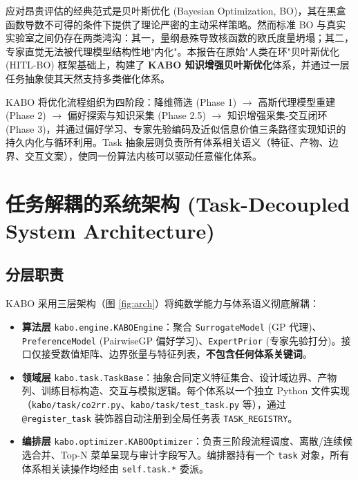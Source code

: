 \documentclass[12pt,a4paper]{article}
\begin{document}
应对昂贵评估的经典范式是贝叶斯优化 (Bayesian Optimization, BO)\cite{bo2012}，其在黑盒函数导数不可得的条件下提供了理论严密的主动采样策略\cite{botorch2019, turbo2019}。然而标准 BO 与真实实验室之间仍存在两类鸿沟：其一，量纲悬殊导致核函数的欧氏度量坍塌\cite{turbo2019}；其二，专家直觉无法被代理模型结构性地"内化"。本报告在原始"人类在环"贝叶斯优化 (HITL-BO) 框架基础上，构建了 \textbf{KABO 知识增强贝叶斯优化}体系，并通过一层任务抽象使其天然支持多类催化体系。

KABO 将优化流程组织为四阶段：降维筛选 (Phase 1) $\rightarrow$ 高斯代理模型重建 (Phase 2) $\rightarrow$ 偏好探索与知识采集 (Phase 2.5) $\rightarrow$ 知识增强采集-交互闭环 (Phase 3)，并通过偏好学习\cite{astudillo2019}、专家先验编码\cite{li2020prior}及近似信息价值\cite{wu2016kg}三条路径实现知识的持久内化与循环利用。Task 抽象层则负责所有体系相关语义（特征、产物、边界、交互文案），使同一份算法内核可以驱动任意催化体系。


\section{任务解耦的系统架构 (Task-Decoupled System Architecture)}

\subsection{分层职责}

KABO 采用三层架构（图 \ref{fig:arch}）将纯数学能力与体系语义彻底解耦：

\begin{itemize}
    \item \textbf{算法层} \texttt{kabo.engine.KABOEngine}：聚合 \texttt{SurrogateModel} (GP 代理)、\texttt{PreferenceModel} (PairwiseGP 偏好学习)、\texttt{ExpertPrior} (专家先验打分)。接口仅接受数值矩阵、边界张量与特征列表，\textbf{不包含任何体系关键词}。
    \item \textbf{领域层} \texttt{kabo.task.TaskBase}：抽象合同定义特征集合、设计域边界、产物列、训练目标构造、交互与模拟逻辑。每个体系以一个独立 Python 文件实现（\texttt{kabo/task/co2rr.py}、\texttt{kabo/task/test\_task.py} 等），通过 \texttt{@register\_task} 装饰器自动注册到全局任务表 \texttt{TASK\_REGISTRY}。
    \item \textbf{编排层} \texttt{kabo.optimizer.KABOOptimizer}：负责三阶段流程调度、离散/连续候选合并、Top-N 菜单呈现与审计字段写入。编排器持有一个 \texttt{task} 对象，所有体系相关读操作均经由 \texttt{self.task.*} 委派。
\end{itemize}
\end{document}
